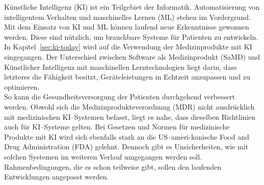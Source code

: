 Künstliche Intelligenz (KI) ist ein Teilgebiet der Informatik. Automatisierung von intelligentem Verhalten und maschinelles Lernen (ML) stehen im Vordergrund. Mit dem Einsatz von KI und ML können laufend neue Erkenntnisse gewonnen werden.
Diese sind nützlich, um brauchbare Systeme für Patienten zu entwickeln.\cite{AI_in_EU}\\
In Kapitel~\ref{sec:ki-today} wird auf die Verwendung der Medizinprodukte mit KI eingegangen.
Der Unterschied zwischen Software als Medizinprodukt (SaMD) und Künstlicher Intelligenz mit maschinellen Lerntechnologien liegt darin, dass letzteres die Fähigkeit besitzt, 
Geräteleistungen in Echtzeit anzupassen und zu optimieren.\cite{AI_in_EU}\\
So kann die Gesundheitsversorgung der Patienten durchgehend verbessert werden. 
Obwohl sich die Medizinprodukteverordnung (MDR) nicht ausdrücklich mit medizinischen KI--Systemen befasst, 
liegt es nahe, dass dieselben Richtlinien auch für KI--Systeme gelten. 
Bei Gesetzen und Normen für medizinische Produkte mit KI wird sich ebenfalls stark an die US--ameri-kanische Food and Drug Administration (FDA) gelehnt. 
Dennoch gibt es Unsicherheiten, wie mit solchen Systemen im weiteren Verlauf umgegangen werden soll. Rahmenbedingungen, die es schon teilweise gibt, sollen den laufenden Entwicklungen angepasst werden.